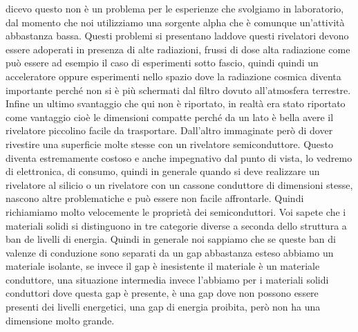 {dicevo questo non è un problema per le esperienze che svolgiamo in laboratorio, dal momento che noi utilizziamo una sorgente alpha che è comunque un'attività abbastanza bassa. Questi problemi si presentano laddove questi rivelatori devono essere adoperati in presenza di alte radiazioni, frussi di dose alta radiazione come può essere ad esempio il caso di esperimenti sotto fascio, quindi quindi un acceleratore oppure esperimenti nello spazio dove la radiazione cosmica diventa importante perché non si è più schermati dal filtro dovuto all'atmosfera terrestre. Infine un ultimo svantaggio che qui non è riportato, in realtà era stato riportato come vantaggio cioè le dimensioni compatte perché da un lato è bella avere il rivelatore piccolino facile da trasportare. Dall'altro immaginate però di dover rivestire una superficie molte stesse con un rivelatore semiconduttore. Questo diventa estremamente costoso e anche impegnativo dal punto di vista, lo vedremo di elettronica, di consumo, quindi in generale quando si deve realizzare un rivelatore al silicio o un rivelatore con un cassone conduttore di dimensioni stesse, nascono altre problematiche e può essere non facile affrontarle. Quindi richiamiamo molto velocemente le proprietà dei semiconduttori. Voi sapete che i materiali solidi si distinguono in tre categorie diverse a seconda dello struttura a ban de livelli di energia. Quindi in generale noi sappiamo che se queste ban di valenze di conduzione sono separati da un gap abbastanza esteso abbiamo un materiale isolante, se invece il gap è inesistente il materiale è un materiale conduttore, una situazione intermedia invece l'abbiamo per i materiali solidi conduttori dove questa gap è presente, è una gap dove non possono essere presenti dei livelli energetici, una gap di energia proibita, però non ha una dimensione molto grande.

}
